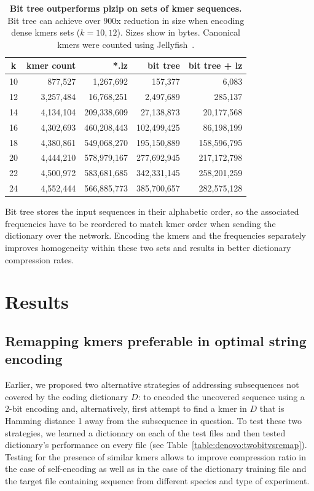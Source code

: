 \documentclass[12pt]{cmuthesis}
\begin{document}
\begin{table}[ht]
  \centering
  \begin{tabular}{c r r r r}
  \toprule
  k & kmer count & *.lz & bit tree & bit tree + lz \\
  \midrule
  10 &   877,527 & 1,267,692 & 157,377 & 6,083 \\
  12 & 3,257,484 & 16,768,251 &  2,497,689 & 285,137 \\
  14 & 4,134,104 & 209,338,609 & 27,138,873 &  20,177,568 \\
  16 & 4,302,693 & 460,208,443 & 102,499,425 & 86,198,199 \\
  18 & 4,380,861 & 549,068,270 & 195,150,889 & 158,596,795 \\
  20 & 4,444,210 & 578,979,167 & 277,692,945 & 217,172,798 \\
  22 & 4,500,972 & 583,681,685 & 342,331,145 & 258,201,259 \\
  24 & 4,552,444 & 566,885,773 & 385,700,657 & 282,575,128 \\
  \bottomrule
  \end{tabular}
  \caption{ \textbf{Bit tree outperforms plzip on sets of kmer sequences.} Bit tree  can achieve over 900x reduction in size when encoding dense kmers sets ($k=10,12$). Sizes show in bytes. Canonical kmers were counted using Jellyfish~\cite{Jellyfish}.}
  \label{fig:denovo:bittree}
\end{table}

Bit tree stores the input sequences in their alphabetic order, so the associated frequencies have to be reordered to match kmer order when sending the dictionary over the network. Encoding the kmers and the frequencies separately improves homogeneity within these two sets and results in better dictionary compression rates.

\section{Results}

  \subsection{Remapping kmers preferable in optimal string encoding}

  Earlier, we proposed two alternative strategies of addressing subsequences not covered by the coding dictionary $D$: to encoded the uncovered sequence using a 2-bit encoding and, alternatively, first attempt to find a kmer in $D$ that is Hamming distance 1 away from the subsequence in question. To test these two strategies, we learned a dictionary on each of the test files and then tested dictionary's performance on every file (see Table~\ref{table:denovo:twobitvsremap}). Testing for the presence of similar kmers allows to improve compression ratio in the case of self-encoding as well as in the case of the dictionary training file and the target file containing sequence from different species and type of experiment.
\end{document}
